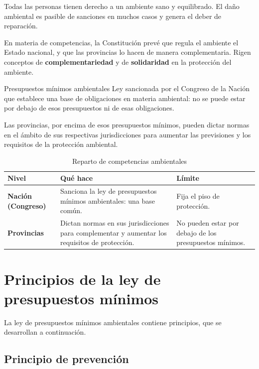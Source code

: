 \documentclass[12pt,oneside]{book}
\begin{document}
Todas las personas tienen derecho a un ambiente sano y equilibrado. El daño ambiental es pasible de sanciones en muchos casos y genera el deber de reparación.

En materia de competencias, la Constitución prevé que regula el ambiente el Estado nacional, y que las provincias lo hacen de manera complementaria. Rigen conceptos de \textbf{complementariedad} y de \textbf{solidaridad} en la protección del ambiente.

\begin{definition}{Presupuestos mínimos ambientales}
Ley sancionada por el Congreso de la Nación que establece una base de obligaciones en materia ambiental: no se puede estar por debajo de esos presupuestos ni de esas obligaciones.
\end{definition}

Las provincias, por encima de esos presupuestos mínimos, pueden dictar normas en el ámbito de sus respectivas jurisdicciones para aumentar las previsiones y los requisitos de la protección ambiental.

\begin{table}[H]
\centering
\small
\caption{Reparto de competencias ambientales}
\begin{tabularx}{\textwidth}{>{\raggedright\arraybackslash\bfseries}p{3.2cm} >{\raggedright\arraybackslash}X >{\raggedright\arraybackslash}X}
\toprule
Nivel & Qué hace & Límite \\
\midrule
Nación (Congreso) & Sanciona la ley de presupuestos mínimos ambientales: una base común. & Fija el piso de protección. \\
Provincias & Dictan normas en sus jurisdicciones para complementar y aumentar los requisitos de protección. & No pueden estar por debajo de los presupuestos mínimos. \\
\bottomrule
\end{tabularx}
\end{table}

\section{Principios de la ley de presupuestos mínimos}

La ley de presupuestos mínimos ambientales contiene principios, que se desarrollan a continuación.

\subsection{Principio de prevención}
\end{document}
